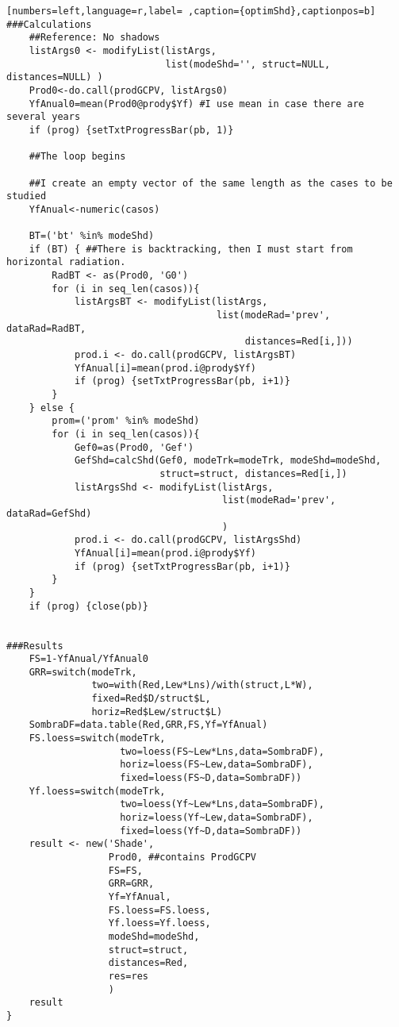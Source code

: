 \begin{lstlisting}[numbers=left,language=r,label= ,caption={optimShd},captionpos=b]
###Calculations	
    ##Reference: No shadows	
    listArgs0 <- modifyList(listArgs,
                            list(modeShd='', struct=NULL, distances=NULL) )
    Prod0<-do.call(prodGCPV, listArgs0)
    YfAnual0=mean(Prod0@prody$Yf) #I use mean in case there are several years
    if (prog) {setTxtProgressBar(pb, 1)}

    ##The loop begins

    ##I create an empty vector of the same length as the cases to be studied
    YfAnual<-numeric(casos) 

    BT=('bt' %in% modeShd)
    if (BT) { ##There is backtracking, then I must start from horizontal radiation.
        RadBT <- as(Prod0, 'G0')
        for (i in seq_len(casos)){
            listArgsBT <- modifyList(listArgs,
                                     list(modeRad='prev', dataRad=RadBT,
                                          distances=Red[i,]))
            prod.i <- do.call(prodGCPV, listArgsBT)
            YfAnual[i]=mean(prod.i@prody$Yf)
            if (prog) {setTxtProgressBar(pb, i+1)}
        }
    } else {
        prom=('prom' %in% modeShd)
        for (i in seq_len(casos)){
            Gef0=as(Prod0, 'Gef')
            GefShd=calcShd(Gef0, modeTrk=modeTrk, modeShd=modeShd,
                           struct=struct, distances=Red[i,])
            listArgsShd <- modifyList(listArgs,
                                      list(modeRad='prev', dataRad=GefShd)
                                      )
            prod.i <- do.call(prodGCPV, listArgsShd)
            YfAnual[i]=mean(prod.i@prody$Yf)
            if (prog) {setTxtProgressBar(pb, i+1)}
        }
    }
    if (prog) {close(pb)}


###Results
    FS=1-YfAnual/YfAnual0
    GRR=switch(modeTrk,
               two=with(Red,Lew*Lns)/with(struct,L*W),
               fixed=Red$D/struct$L,
               horiz=Red$Lew/struct$L)
    SombraDF=data.table(Red,GRR,FS,Yf=YfAnual)
    FS.loess=switch(modeTrk,
                    two=loess(FS~Lew*Lns,data=SombraDF),
                    horiz=loess(FS~Lew,data=SombraDF),
                    fixed=loess(FS~D,data=SombraDF))
    Yf.loess=switch(modeTrk,
                    two=loess(Yf~Lew*Lns,data=SombraDF),
                    horiz=loess(Yf~Lew,data=SombraDF),
                    fixed=loess(Yf~D,data=SombraDF))
    result <- new('Shade',
                  Prod0, ##contains ProdGCPV
                  FS=FS,
                  GRR=GRR,
                  Yf=YfAnual,
                  FS.loess=FS.loess,
                  Yf.loess=Yf.loess,
                  modeShd=modeShd,
                  struct=struct,
                  distances=Red,
                  res=res
                  )
    result
}
\end{lstlisting}
